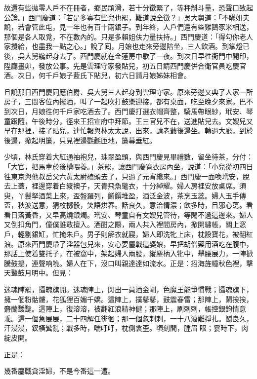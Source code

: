 故還有些拋零人戶不在冊者，鄉民頑滑，若十分徵緊了，等秤斛斗量，恐聲口致起公論。」西門慶道：「若是多寡有些兒也罷，難道說全徵？」吳大舅道：「不瞞姐夫說，若會管此屯，見一年也有百十兩銀子。到年終，人戶們還有些雞鵝豕米相送，那個是各人取覓，不在數內的。只是多賴姐伕力量扶持。」西門慶道：「得勾你老人家攪給，也盡我一點之心。」說了囘，月娘也走來旁邊陪坐，三人飲酒。到掌燈已後，吳大舅纔起身去了。西門慶就在金蓮房中歇了一夜。到次日早徃衙門中開印，陞廳畫卯，發放公事。先是雲理守家發貼兒，初五日請西門慶併合衛官員吃慶官酒。次日，何千戶娘子藍氏下貼兒，初六日請月娘姊妹相會。

且說那日西門慶同應伯爵、吳大舅三人起身到雲理守家。原來旁邊又典了人家一所房子，三間客位內擺酒，叫了一起吹打鼓樂迎接，都有桌面，吃至晚夕來家。巴不到次日，月娘徃何千戶家吃酒去了。西門慶打選衣帽齊整，騎馬帶眼紗，玳安、琴童跟隨，午後時分，徑來王招宣府中拜節。王三官兒不在，送進貼兒去。文嫂兒又早在那裡，接了貼兒，連忙報與林太太說，出來，請老爺後邊坐。轉過大廳，到於後邊，掀起明簾，只見裡邊氍毹匝地，簾幕垂紅。

少頃，林氏穿着大紅通袖袍兒，珠翠盈頭，與西門慶見畢禮數，留坐待茶，分付：「大官，把馬牽於後槽喂養。」茶罷，讓西門慶寬衣房內坐，說道：「小兒從初四日徃東京與他叔岳父六黃太尉磕頭去了，只過了元宵纔來。」西門慶一面喚玳安，脫去上蓋，裡邊穿着白綾襖子，天青飛魚氅衣，十分綽耀。婦人房裡安放桌席。須臾，丫鬟拏酒菜上來，盃盤羅列，餚饌堆盈，酒泛金波，茶烹玉蕊。婦人玉手傳盃，秋波送意，猜枚擲骰，笑語烘春。話良久，意洽情濃；飲多時，目邪心蕩。看看日落黃昏，又早高燒銀燭。玳安、琴童自有文嫂兒管待，等閑不過這邊來。婦人又倒扣角門，僮僕誰敢擅入。酒酣之際，兩人共入裡間房內，掀開繡帳，關上窓戶，輕剔銀缸，忙掩朱戶。男子則解衣就寢，婦人即洗牝上床，枕設寶花，被翻紅浪。原來西門慶帶了淫器包兒來，安心要鏖戰這婆娘，早把胡僧藥用酒吃在腹中，那話上使着雙托子，在被窩中，架起婦人兩股，縱麈柄入牝中，舉腰展力，一陣掀騰鼓搗，連聲响喨。婦人在下，沒口叫親達達如流水。正是：招海旌幢秋色裡，擊天鼙鼓月明中。但見：

\begin{myquote}
迷魂陣罷，攝魄旗開。迷魂陣上，閃出一員酒金剛，色魔王能爭慣戰；攝魂旗下，擁一個粉骷髏，花狐狸百媚千嬌。這陣上，撲鼕鼕，鼓震春雷；那陣上，鬧挨挨，麝蘭靉靆。這陣上，復溶溶，被翻紅浪精神健；那陣上，刷剌剌，帳控銀鉤情意乖。這一個急展展，二十四解任徘徊；那一個忽剌剌，一十八滾難掙扎。鬪良久，汗浸浸，釵橫鬂亂；戰多時，喘吁吁，枕側衾歪。頃刻間，腫眉𦣘眼；霎時下，肉綻皮開。
\end{myquote}

正是：

\begin{myquote}
幾番鏖戰貪淫婦，不是今番這一遭。
\end{myquote}

